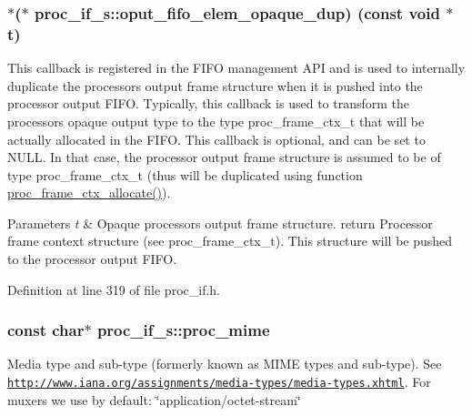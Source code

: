 \subsubsection[{\texorpdfstring{oput\+\_\+fifo\+\_\+elem\+\_\+opaque\+\_\+dup}{oput_fifo_elem_opaque_dup}}]{$\ast$($\ast$ proc\+\_\+if\+\_\+s\+::oput\+\_\+fifo\+\_\+elem\+\_\+opaque\+\_\+dup) (const void $\ast$t)}\hypertarget{structproc__if__s_a7806bbda25988d9ee54f6d0bb143c697}{}\label{structproc__if__s_a7806bbda25988d9ee54f6d0bb143c697}
This callback is registered in the F\+I\+FO management A\+PI and is used to internally duplicate the processor\textquotesingle{}s output frame structure when it is pushed into the processor output F\+I\+FO. Typically, this callback is used to transform the processor\textquotesingle{}s opaque output type to the type proc\+\_\+frame\+\_\+ctx\+\_\+t that will be actually allocated in the F\+I\+FO. This callback is optional, and can be set to N\+U\+LL. In that case, the processor output frame structure is assumed to be of type proc\+\_\+frame\+\_\+ctx\+\_\+t (thus will be duplicated using function \textquotesingle{}\hyperlink{proc__if_8c_a26df07b260850afd03ec73572608a034}{proc\+\_\+frame\+\_\+ctx\+\_\+allocate()}\textquotesingle{}). 
\begin{DoxyParams}{Parameters}
{\em t} & Opaque processor\textquotesingle{}s output frame structure. return Processor frame context structure (see proc\+\_\+frame\+\_\+ctx\+\_\+t). This structure will be pushed to the processor output F\+I\+FO. \\
\hline
\end{DoxyParams}


Definition at line 319 of file proc\+\_\+if.\+h.

\subsubsection[{\texorpdfstring{proc\+\_\+mime}{proc_mime}}]{\setlength{\rightskip}{0pt plus 5cm}const char$\ast$ proc\+\_\+if\+\_\+s\+::proc\+\_\+mime}\hypertarget{structproc__if__s_afdb204f8c976ed829466774aaa6cdf89}{}\label{structproc__if__s_afdb204f8c976ed829466774aaa6cdf89}
Media type and sub-\/type (formerly known as M\+I\+ME types and sub-\/type). See \href{http://www.iana.org/assignments/media-types/media-types.xhtml}{\tt http\+://www.\+iana.\+org/assignments/media-\/types/media-\/types.\+xhtml}. For muxers we use by default\+: \char`\"{}application/octet-\/stream\char`\"{} 

